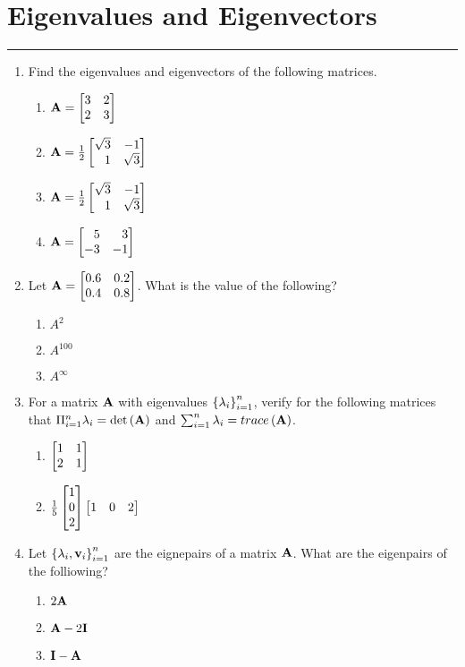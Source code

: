 \documentclass[
10pt, %
a4paper, %
oneside, %
headinclude,footinclude, %
BCOR5mm, %
]{scrartcl}
\def\mf{\ensuremath\mathbf}
\def\lp{\ensuremath\left(}
\def\rp{\ensuremath\right)}
\def\lc{\ensuremath\left\{}
\def\rc{\ensuremath\right\}}
\def\bmx{\ensuremath\begin{bmatrix*}[r]}
\def\emx{\ensuremath\end{bmatrix*}}
\begin{document}
\newpage
\section{Eigenvalues and Eigenvectors}
\hrule
\vspace{0.5cm}

\begin{enumerate}
	\item Find the eigenvalues and eigenvectors of the following matrices.
	\begin{enumerate}
		\item $\mf{A} = \bmx 3 & 2 \\ 2 & 3 \emx$
		\item $\mf{A} = \frac{1}{2}\bmx \sqrt{3} & -1\\ 1 & \sqrt{3}\emx$
		\item $\mf{A} = \frac{1}{2}\bmx \sqrt{3} & -1\\ 1 & \sqrt{3}\emx$
		\item $\mf{A} = \bmx 5 & 3\\ -3 & -1\emx$
	\end{enumerate}
	
	\item Let $\mf{A} = \bmx 0.6 & 0.2\\ 0.4 & 0.8\emx$. What is the value of the following?
	\begin{enumerate}
		\item $A^2$
		\item $A^{100}$
		\item $A^\infty$
	\end{enumerate}

    \item For a matrix $\mf{A}$ with eigenvalues $\lc\lambda_i\rc_{i=1}^{n}$, verify for the following matrices that $\Pi_{i=1}^n\lambda_i = \det \lp\mf{A}\rp$ and $\sum_{i=1}^n \lambda_i = trace\lp\mf{A}\rp$.
    \begin{enumerate}
        \item $\bmx 1 & 1 \\ 2 & 1\emx$
        \item $\frac{1}{5}\bmx 1 \\ 0 \\ 2 \emx \bmx 1 & 0 & 2\emx$
    \end{enumerate}

	\item Let $\lc \lambda_i, \mf{v}_i\rc_{i=1}^n$ are the eignepairs of a matrix $\mf{A}$. What are the eigenpairs of the folliowing?
    \begin{enumerate}
         \item $2\mf{A}$
         \item $\mf{A} - 2\mf{I}$
         \item $\mf{I} - \mf{A}$
     \end{enumerate}

\end{enumerate}
\end{document}
